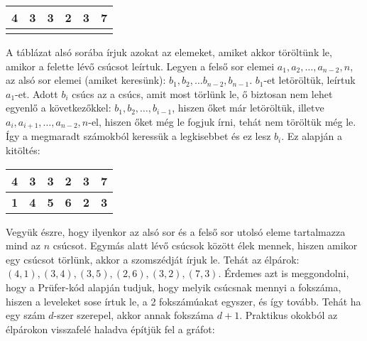 \documentclass[a4paper,12pt,twoside]{book}
\theoremstyle{break}
\begin{document}
\begin{center}
\begin{tabular}{|c|c|c|c|c|c|}\hline
4 & 3 & 3 & 2 & 3 & \textbf{7}\\\hline
 &  &  &  &  & \\\hline
\end{tabular}
\end{center}

A táblázat alsó sorába írjuk azokat az elemeket, amiket akkor töröltünk le, amikor a felette lévő csúcsot leírtuk. Legyen a felső sor elemei $a_1,a_{2},\ldots,a_{n-2},n$, az alsó sor elemei (amiket keresünk): $b_1,b_2,\ldots b_{n-2}, b_{n-1}$. $b_1$-et letöröltük, leírtuk $a_1$-et. Adott $b_i$ csúcs az a csúcs, amit most törlünk le, ő biztosan nem lehet egyenlő a következőkkel: $b_1,b_2,\ldots,b_{i-1}$, hiszen őket már letöröltük, illetve $a_{i},a_{i+1},\ldots,a_{n-2},n$-el, hiszen őket még le fogjuk írni, tehát nem töröltük még le. Így a megmaradt számokból keressük a legkisebbet és ez lesz $b_i$. Ez alapján a kitöltés:

\begin{center}
\begin{tabular}{|c|c|c|c|c|c|}\hline
4 & 3 & 3 & 2 & 3 & \textbf{7}\\\hline
\textbf{1} & \textbf{4} & \textbf{5} & \textbf{6} & \textbf{2} & \textbf{3} \\\hline
\end{tabular}
\end{center}

Vegyük észre, hogy ilyenkor az alsó sor és a felső sor utolsó eleme tartalmazza mind az $n$ csúcsot. Egymás alatt lévő csúcsok között élek mennek, hiszen amikor egy csúcsot törlünk, akkor a szomszédját írjuk le. Tehát az élpárok: $(4,1), (3,4), (3,5), (2,6), (3,2), (7,3)$. Érdemes azt is meggondolni, hogy a Prüfer-kód alapján tudjuk, hogy melyik csúcsnak mennyi a fokszáma, hiszen a leveleket sose írtuk le, a 2 fokszámúakat egyszer, és így tovább. Tehát ha egy szám $d$-szer szerepel, akkor annak fokszáma $d+1$. Praktikus okokból az élpárokon visszafelé haladva építjük fel a gráfot:
\begin{center}
\end{center}
\end{document}
